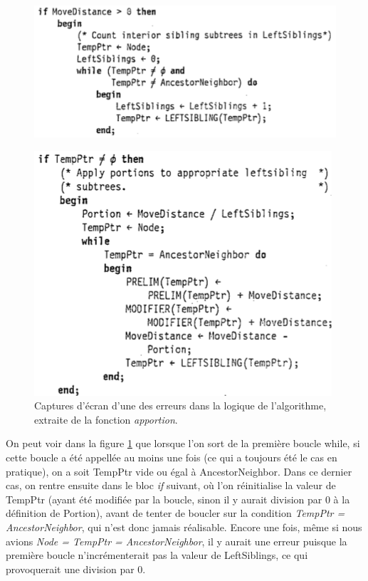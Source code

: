 \documentclass{article}
\begin{document}
  \begin{figure}[h]
    \begin{center}
        \includegraphics[scale=0.4]{erreur1.png}
    \end{center}
  \end{figure}

  \begin{figure}[h]
    \begin{center}
        \includegraphics[scale=0.4]{erreur2.png}
    \end{center}
    \caption{Captures d'écran d'une des erreurs dans la logique de l'algorithme, extraite de la fonction \emph{apportion}.}
    \label{fig:erreur2}
  \end{figure}

On peut voir dans la figure \ref{fig:erreur2} que lorsque l'on sort de la première boucle while, si cette boucle a été appellée au moins une fois (ce qui a toujours été le cas en pratique), on a soit TempPtr vide ou égal à AncestorNeighbor. Dans ce dernier cas, on rentre ensuite dans le bloc \emph{if} suivant, où l'on réinitialise la valeur de TempPtr (ayant été modifiée par la boucle, sinon il y aurait division par 0 à la définition de Portion), avant de tenter de boucler sur la condition \emph{TempPtr = AncestorNeighbor}, qui n'est donc jamais réalisable.
Encore une fois, même si nous avions \emph{Node = TempPtr = AncestorNeighbor}, il y aurait une erreur puisque la première boucle n'incrémenterait pas la valeur de LeftSiblings, ce qui provoquerait une division par 0.
\end{document}
